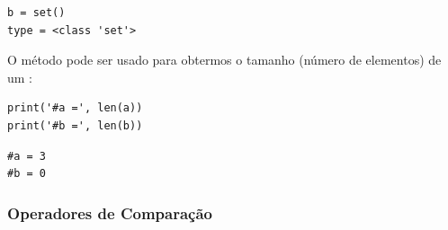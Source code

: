 \begin{verbatim}
b = set()
type = <class 'set'>  
\end{verbatim}

O método {\PYTHONlen} pode ser usado para obtermos o tamanho (número de elementos) de um {\PYTHONset}:

\begin{lstlisting}
print('#a =', len(a))
print('#b =', len(b))
\end{lstlisting}

\begin{verbatim}
#a = 3
#b = 0  
\end{verbatim}

\subsubsection{Operadores de Comparação}\label{cap_lingua_sec_colecao:sssec:opcomp}

